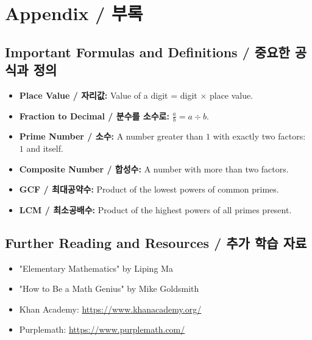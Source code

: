 \cleardoublepage
\chapter{Appendix / 부록}

\section*{Important Formulas and Definitions / 중요한 공식과 정의}

\begin{itemize}
  \item \textbf{Place Value / 자리값:} Value of a digit = digit $\times$ place value.  
  \item \textbf{Fraction to Decimal / 분수를 소수로:} $\frac{a}{b} = a \div b$.  
  \item \textbf{Prime Number / 소수:} A number greater than $1$ with exactly two factors: $1$ and itself.  
  \item \textbf{Composite Number / 합성수:} A number with more than two factors.  
  \item \textbf{GCF / 최대공약수:} Product of the lowest powers of common primes.  
  \item \textbf{LCM / 최소공배수:} Product of the highest powers of all primes present.  
\end{itemize}

\section*{Further Reading and Resources / 추가 학습 자료}

\begin{itemize}
  \item "Elementary Mathematics" by Liping Ma
  \item "How to Be a Math Genius" by Mike Goldsmith
  \item Khan Academy: \url{https://www.khanacademy.org/}
  \item Purplemath: \url{https://www.purplemath.com/}
\end{itemize}

\newpage

